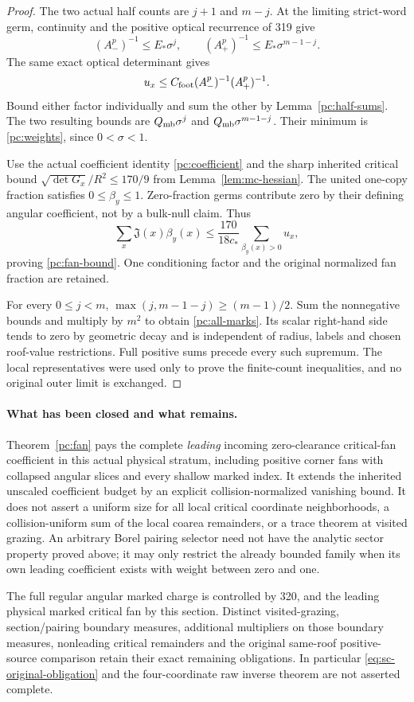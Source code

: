 \begin{proof}
The two actual half counts are $j+1$ and $m-j$. At the limiting
strict-word germ, continuity and the positive optical recurrence
of 319 give
\[
 (A_-^p)^{-1}\le E_*\sigma^j,\qquad
 (A_+^p)^{-1}\le E_*\sigma^{m-1-j}.
\]
The same exact optical determinant gives
\[
 u_x\le C_{\rm foot}(A_-^p)^{-1}(A_+^p)^{-1}.
\]
Bound either factor individually and sum the other by
Lemma~\ref{pc:half-sums}. The two resulting bounds are
$Q_{\rm mb}\sigma^j$ and $Q_{\rm mb}\sigma^{m-1-j}$.
Their minimum is \eqref{pc:weights}, since $0<\sigma<1$.

Use the actual coefficient identity \eqref{pc:coefficient} and
the sharp inherited critical bound
$\sqrt{\det G_x}/R^2\le170/9$ from Lemma~\ref{lem:mc-hessian}.
The united one-copy fraction satisfies $0\le\beta_y\le1$.
Zero-fraction germs contribute zero by their defining angular
coefficient, not by a bulk-null claim. Thus
\[
 \sum_x\mathfrak J(x)\beta_y(x)
 \le\frac{170}{18c_*}
       \sum_{\beta_y(x)>0}u_x,
\]
proving \eqref{pc:fan-bound}. One conditioning factor and the
original normalized fan fraction are retained.

For every $0\le j<m$,
$\max(j,m-1-j)\ge(m-1)/2$.
Sum the nonnegative bounds and multiply by $m^2$ to obtain
\eqref{pc:all-marks}. Its scalar right-hand side tends to zero by
geometric decay and is independent of radius, labels and chosen
roof-value restrictions. Full positive sums precede every such
supremum. The local representatives were used only to prove the
finite-count inequalities, and no original outer limit is exchanged.
\end{proof}

\paragraph{What has been closed and what remains.}
Theorem~\ref{pc:fan} pays the complete \emph{leading} incoming
zero-clearance critical-fan coefficient in this actual physical
stratum, including positive corner fans with collapsed angular
slices and every shallow marked index. It extends the inherited
unscaled coefficient budget by an explicit collision-normalized
vanishing bound. It does not assert a uniform size for all local
critical coordinate neighborhoods, a collision-uniform sum of the
local coarea remainders, or a trace theorem at visited grazing.
An arbitrary Borel pairing selector need not have the analytic
sector property proved above; it may only restrict the already
bounded family when its own leading coefficient exists with weight
between zero and one.

The full regular angular marked charge is controlled by 320, and
the leading physical marked critical fan by this section.
Distinct visited-grazing, section/pairing boundary measures,
additional multipliers on those boundary measures, nonleading critical remainders
and the original same-roof positive-source comparison retain
their exact remaining obligations. In particular
\eqref{eq:sc-original-obligation} and the four-coordinate raw
inverse theorem are not asserted complete.
